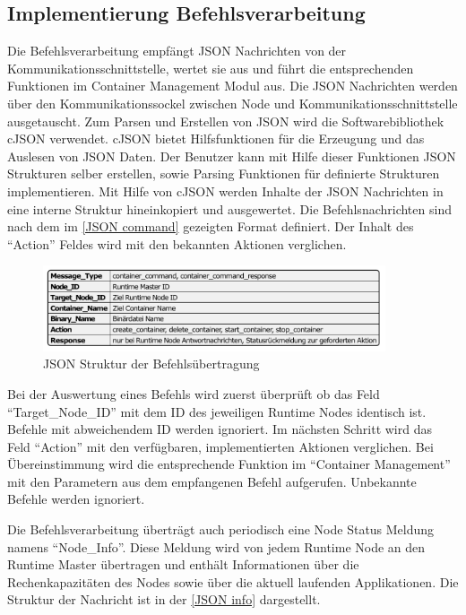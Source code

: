 \subsection{Implementierung Befehlsverarbeitung}

Die Befehlsverarbeitung empfängt \gls{JSON} Nachrichten von der Kommunikationsschnittstelle, wertet sie aus und führt die entsprechenden Funktionen im Container Management Modul aus. Die \gls{JSON} Nachrichten werden über den Kommunikationssockel zwischen Node und Kommunikationsschnittstelle ausgetauscht. Zum Parsen und Erstellen von \gls{JSON} wird die Softwarebibliothek cJSON verwendet.  cJSON bietet Hilfsfunktionen für die Erzeugung und das Auslesen von \gls{JSON} Daten. Der Benutzer kann mit Hilfe dieser Funktionen \gls{JSON} Strukturen selber erstellen, sowie Parsing Funktionen für definierte Strukturen implementieren. Mit Hilfe von cJSON werden Inhalte der \gls{JSON} Nachrichten in eine interne Struktur hineinkopiert und ausgewertet. Die Befehlsnachrichten sind nach dem im \autoref{JSON command} gezeigten Format definiert. Der Inhalt des \enquote{Action} Feldes wird mit den bekannten Aktionen verglichen. 

\begin{figure}[htbp]
	\centering
	\includegraphics[width=0.9\textwidth]{./content/graphics/commandJSON.pdf}
	\caption{JSON Struktur der Befehlsübertragung}
	\label{JSON command}
\end{figure}

Bei der Auswertung eines Befehls wird zuerst überprüft ob das Feld \enquote{Target\_Node\_ID} mit dem ID des jeweiligen Runtime Nodes identisch ist. Befehle mit abweichendem ID werden ignoriert. Im nächsten Schritt wird das Feld \enquote{Action} mit den verfügbaren, implementierten Aktionen verglichen. Bei Übereinstimmung wird die entsprechende Funktion im \enquote{Container Management} mit den Parametern aus dem empfangenen Befehl aufgerufen. Unbekannte Befehle werden ignoriert.

Die Befehlsverarbeitung überträgt auch periodisch eine Node Status Meldung namens \enquote{Node\_Info}. Diese Meldung wird von jedem Runtime Node an den Runtime Master übertragen und enthält Informationen über die Rechenkapazitäten des Nodes sowie über die aktuell laufenden Applikationen. Die Struktur der Nachricht ist in der \autoref{JSON info} dargestellt.

